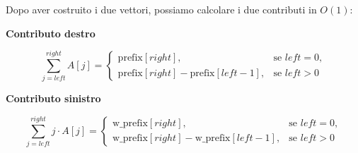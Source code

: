 Dopo aver costruito i due vettori, possiamo calcolare i due contributi in $O(1)$:

\medskip
\textbf{Contributo destro}

\[
\sum_{j = left}^{right} A[j] =
\begin{cases}
	\text{prefix}[right], & \text{se } left = 0,\\
	\text{prefix}[right] - \text{prefix}[left-1], & \text{se } left > 0
\end{cases}
\]

\textbf{Contributo sinistro}

\[
\sum_{j = left}^{right} j \cdot A[j] =
\begin{cases}
	\text{w\_prefix}[right], & \text{se } left = 0,\\
	\text{w\_prefix}[right] - \text{w\_prefix}[left-1], & \text{se } left > 0
\end{cases}
\]

\bigskip

